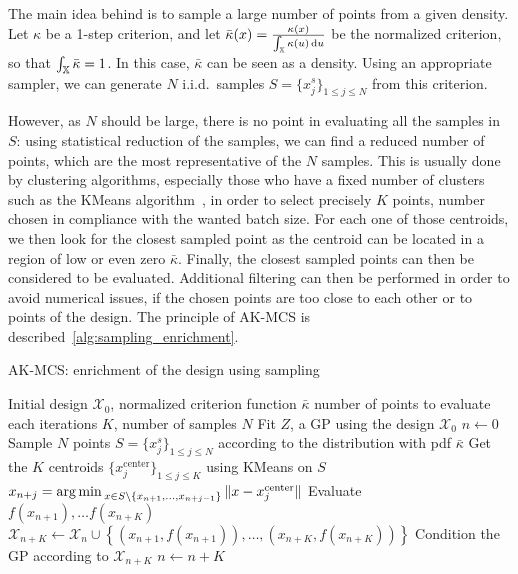 \documentclass[../../Main_ManuscritThese.tex]{subfiles}
\begin{document}
The main idea behind %
is to sample a large number of points from a given density.  Let
$\kappa$ be a 1-step criterion, and let
$\bar{\kappa}(x) =
\frac{\kappa(x)}{\int_{\mathbb{X}}\kappa(u)\,\mathrm{d}u}$ be the
normalized criterion, so that $\int_{\mathbb{X}} \bar{\kappa}=1$. In this
case, $\bar{\kappa}$ can be seen as a density.  Using an appropriate
sampler, we can generate $N$ i.i.d.\ samples
$S=\{x_j^s\}_{1\leq j \leq N}$ from this criterion.

  
However, as $N$ should be large, there is no point in evaluating all
the samples in $S$: using statistical reduction of the samples, we can
find a reduced number of points, which are the most representative of
the $N$ samples. This is usually done by clustering algorithms,
especially those who have a fixed number of clusters such as the
KMeans algorithm~\citep{macqueen_methods_1967}, in order to select
precisely $K$ points, number chosen in compliance with the wanted
batch size. For each one of those centroids, we then look for the
closest sampled point as the centroid can be located in a region of
low or even zero $\bar{\kappa}$. Finally, the closest sampled points
can then be considered to be evaluated.  Additional filtering can then
be performed in order to avoid numerical issues, if the chosen points
are too close to each other or to points of the design.  The principle
of AK-MCS is described~\cref{alg:sampling_enrichment}.

\begin{algorithm}
\caption{AK-MCS: enrichment of the design using sampling}
\label{alg:sampling_enrichment}
\begin{algorithmic}
  \REQUIRE Initial design $\mathcal{X}_0$, normalized criterion function $\bar{\kappa}$
  \REQUIRE number of points to evaluate each iterations $K$, number of samples $N$
\STATE Fit $Z$, a GP using the design $\mathcal{X}_0$
\STATE $n \leftarrow 0$
\STATE Sample $N$ points $S = \{x^s_j\}_{1 \leq j \leq N}$ according to the distribution with pdf $\bar{\kappa}$
\STATE Get the $K$ centroids $\{x_j^{\mathrm{center}}\}_{1 \leq j \leq K}$ using KMeans on $S$
\STATE $x_{n+j}=\operatorname*{arg\,min \,}_{x \in S \setminus \{x_{n+1}, \dots, x_{n+j-1}\}} \|x - x_j^{\mathrm{center}} \|$
\ENDFOR
\STATE Evaluate $f(x_{n+1}),\dots f(x_{n+K})$
\STATE $\mathcal{X}_{n+K} \leftarrow \mathcal{X}_n \cup \left\{\left(x_{n+1}, f(x_{n+1})\right),\dots,  \left(x_{n+K}, f(x_{n+K})\right)\right\}$
\STATE Condition the GP according to $\mathcal{X}_{n+K}$
\STATE $n \leftarrow n + K$
\ENDWHILE
\end{algorithmic}
\end{algorithm}
\end{document}
